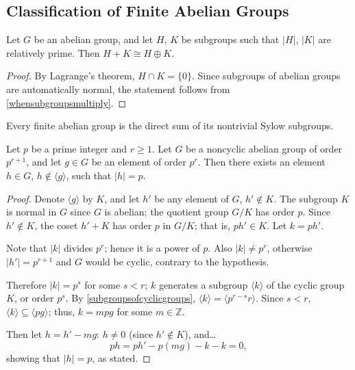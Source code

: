 \subsection{Classification of Finite Abelian Groups}\label{classificationoffiniteabeliangroups}

\begin{lemma}
\label{freeabeliangroupdecomposition}
Let $G$ be an abelian group, and let $H$, $K$ be subgroups such that $|H|$, $|K|$ are relatively prime. Then $H + K \cong H \oplus K$. 
\end{lemma}

\begin{proof}
By Lagrange's theorem, $H \cap K = \{ 0 \}$. Since subgroups of abelian groups are automatically normal, the statement follows from \ref{whensubgroupsmultiply}.
\end{proof}

\begin{corollary}
\label{abeliansylowgroups}
Every finite abelian group is the direct sum of its nontrivial Sylow subgroups.
\end{corollary}

\begin{lemma}
\label{elementoforderpinabeliangroup}
Let $p$ be a prime integer and $r \geq 1$. Let $G$ be a noncyclic abelian group of order $p^{r+1}$, and let $g \in G$ be an element of order $p^r$. Then there exists an element $h \in G$,
$h \not \in \langle g \rangle$, such that $|h| = p$.
\end{lemma}

\begin{proof}
Denote $\langle g \rangle$ by $K$, and let $h'$ be any element of $G$, $h' \not \in K$. The subgroup $K$ is normal in $G$ since $G$ is abelian; the quotient group $G/K$ has order $p$.
Since $h' \not \in K$, the coset $h' + K$ has order $p$ in $G/K$; that is, $ph' \in K$. Let $k = ph'.$

Note that $|k|$ divides $p^r$; hence it is a power of $p$. Also $|k| \neq p^r$, otherwise $|h'| = p^{r+1}$ and $G$ would be cyclic, contrary to the hypothesis.

Therefore $|k| = p^s$ for some $s < r$; $k$ generates a subgroup $\langle k \rangle$ of the cyclic group $K$, or order $p^s$. By \ref{subgroupsofcyclicgroups}, $\langle k \rangle = \langle p^{r-s}r \rangle$.
Since $s < r$, $\langle k \rangle \subseteq \langle pg \rangle$; thus, $k = mpg$ for some $m \in \mathbb{Z}$.

Then let $h = h' - mg$: $h \neq 0$ (since $h' \not \in K$), and\dots
$$ph = ph' - p(mg) - k -k =0,$$
showing that $|h| = p$, as stated.
\end{proof}

